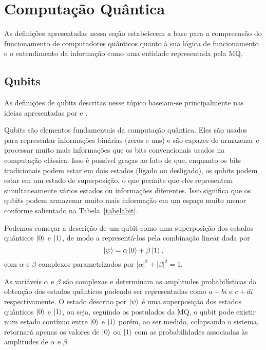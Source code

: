 \section{Computação Quântica}\label{sec:compquant}

As definições apresentadas nessa seção estabelecem a base para a compreensão do funcionamento de computadores quânticos quanto à sua lógica de funcionamento e o entendimento da informação como uma entidade representada pela MQ.

\subsection{Qubits}\label{sec:qubits}

As definições de qubits descritas nesse tópico baseiam-se principalmente nas ideias apresentadas por \textcite{chuang} e \textcite{CompInfoQuantica}.

Qubits são elementos fundamentais da computação quântica. Eles são usados para representar informações binárias (zeros e uns) e são capazes de armazenar e processar muito mais informações que os bits convencionais usados na computação clássica. Isso é possível graças ao fato de que, enquanto os bits tradicionais podem estar em dois estados (ligado ou desligado), os qubits podem estar em um estado de superposição, o que permite que eles representem simultaneamente vários estados ou informações diferentes. Isso significa que os qubits podem armazenar muito mais informação em um espaço muito menor conforme salientado na Tabela~\ref{tabelabit}.

Podemos começar a descrição de um qubit como uma superposição dos estados quânticos $\ket{0}$ e $\ket{1}$, de modo a representá-los pela combinação linear dada por
\begin{equation}\label{eq:psi}
\ket{\psi} = \alpha \ket{0} + \beta \ket{1},
\end{equation}
com $\alpha$ e $\beta$ complexos parametrizados por \(|\alpha|^{2} + |\beta|^{2} = 1\).

As variáveis $\alpha$ e $\beta$ são complexas e determinam as amplitudes probabilísticas da obtenção dos estados quânticos podendo ser representadas como $a+bi$ e $c+di$ respectivamente. O estado descrito por $\ket{\psi}$ é uma superposição dos estados quânticos $\ket{0}$ e $\ket{1}$, ou seja, seguindo os postulados da MQ, o qubit pode existir num estado contínuo entre $\ket{0}$ e $\ket{1}$ porém, ao ser medido, colapsando o sistema, retornará apenas os valores de $\ket{0}$ ou $\ket{1}$ com as probabilidades associadas às amplitudes de $\alpha$ e $\beta$.

